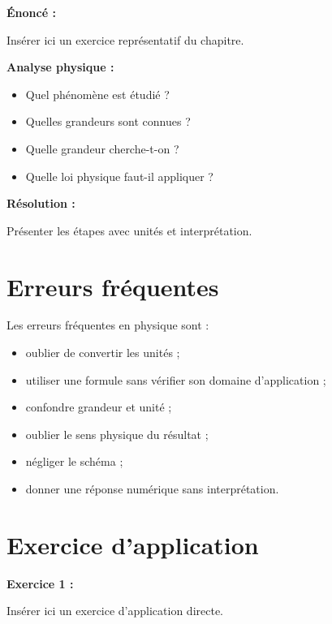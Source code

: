 \documentclass[11pt,a4paper]{article}
\begin{document}
\begin{cadreexemple}
\textbf{Énoncé :}

Insérer ici un exercice représentatif du chapitre.

\medskip

\textbf{Analyse physique :}
\begin{itemize}
    \item Quel phénomène est étudié ?
    \item Quelles grandeurs sont connues ?
    \item Quelle grandeur cherche-t-on ?
    \item Quelle loi physique faut-il appliquer ?
\end{itemize}

\medskip

\textbf{Résolution :}

Présenter les étapes avec unités et interprétation.
\end{cadreexemple}

\section{Erreurs fréquentes}

\begin{cadreattention}
Les erreurs fréquentes en physique sont :
\begin{itemize}
    \item oublier de convertir les unités ;
    \item utiliser une formule sans vérifier son domaine d’application ;
    \item confondre grandeur et unité ;
    \item oublier le sens physique du résultat ;
    \item négliger le schéma ;
    \item donner une réponse numérique sans interprétation.
\end{itemize}
\end{cadreattention}

\section{Exercice d’application}

\begin{cadreenonce}
\textbf{Exercice 1 :}

Insérer ici un exercice d’application directe.
\end{cadreenonce}
\end{document}
